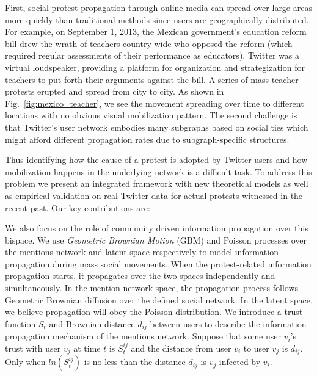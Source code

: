First, social protest propagation through online media can spread
over large areas more quickly than traditional
methods since users are geographically distributed. For example,
on September 1, 2013, the Mexican government's education reform bill drew
the wrath of teachers country-wide who opposed the reform
(which required regular assessments of their performance as educators).
Twitter was a virtual loudspeaker, providing a platform for organization
and strategization for teachers to put forth their arguments against
the bill. A series of mass teacher protests erupted and spread
from city to city. As shown in Fig.~\ref{fig:mexico_teacher}, we
see the movement spreading over time to different locations with
no obvious visual mobilization pattern. The second challenge is
that Twitter's user network embodies many subgraphs based on
social ties which might afford different propagation rates due to
subgraph-specific structures.

Thus identifying how the cause of a protest is adopted by Twitter users and how mobilization happens in the underlying network is a difficult task.
To address this problem we present an integrated framework with new
theoretical models as well as empirical validation on real Twitter
data for actual protests witnessed in the recent past. Our key
contributions are:

\iffalse
We also focus on the role of community driven information propagation over this bispace. We use \textit{Geometric Brownian Motion} (GBM) and Poisson processes over the mentions network and latent space respectively to model information propagation during mass social movements. When the protest-related information propagation starts, it propagates over the two spaces independently and simultaneously. In the mention network space, the propagation process follows Geometric Brownian diffusion over the defined social network. In the latent space, we believe propagation will obey the Poisson distribution. We introduce a trust function $S_t$ and Brownian distance $d_{ij}$ between users to describe the information propagation mechanism of the mentions network. Suppose that some user $v_i$'s trust with user $v_j$ at time $t$ is $S^{ij}_t$ and the distance from user $v_i$ to user $v_j$ is $d_{ij}$. Only when $ln(S^{ij}_t)$ is no less than the distance $d_{ij}$ is $v_j$ infected by $v_i$.



